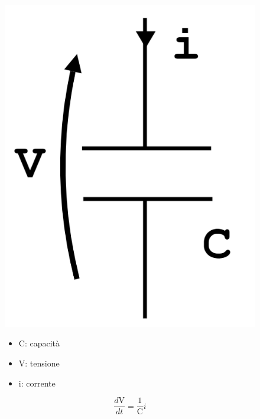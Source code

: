 	\begin{figure}[H]
		\begin{minipage}{.3\textwidth}
			\centering
			\includegraphics[width=.4\linewidth]{"Images/condensatore.png"}
		\end{minipage}%
		\begin{minipage}{.3\textwidth}
			\begin{itemize}
				\item C: capacità
				\item V: tensione
				\item i: corrente
			\end{itemize}
		\end{minipage}
		\begin{minipage}{.3\textwidth}
			\centering
			\begin{equation*}
				\boxed{\frac{d\text{V}}{dt} = \frac{1}{\text{C}}i}
			\end{equation*}
		\end{minipage}
	\end{figure}
	
